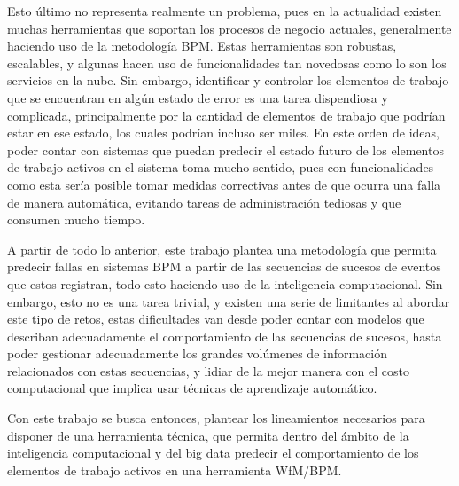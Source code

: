 Esto último no representa realmente un problema, pues en la actualidad existen muchas herramientas que soportan los procesos de negocio actuales, generalmente haciendo uso de la metodología BPM. Estas herramientas son robustas, escalables, y algunas hacen uso de funcionalidades tan novedosas como lo son los servicios en la nube. Sin embargo, identificar y controlar los elementos de trabajo que se encuentran en algún estado de error es una tarea dispendiosa y complicada, principalmente por la cantidad de elementos de trabajo que podrían estar en ese estado, los cuales podrían incluso ser miles. En este orden de ideas, poder contar con sistemas que puedan predecir el estado futuro de los elementos de trabajo activos en el sistema toma mucho sentido, pues con funcionalidades como esta sería posible tomar medidas correctivas antes de que ocurra una falla de manera automática, evitando tareas de administración tediosas y que consumen mucho tiempo. 

A partir de todo lo anterior, este trabajo plantea una metodología que permita predecir fallas en sistemas BPM a partir de las secuencias de sucesos de eventos que estos registran, todo esto haciendo uso de la inteligencia computacional. Sin embargo, esto no es una tarea trivial, y existen una serie de limitantes al abordar este tipo de retos, estas dificultades van desde poder contar con modelos que describan adecuadamente el comportamiento de las secuencias de sucesos, hasta poder gestionar adecuadamente los grandes volúmenes de información relacionados con estas secuencias, y lidiar de la mejor manera con el costo computacional que implica usar técnicas de aprendizaje automático. 

Con este trabajo se busca entonces, plantear los lineamientos necesarios para disponer de una herramienta técnica, que permita dentro del ámbito de la inteligencia computacional y del big data predecir el comportamiento de los elementos de trabajo activos en una herramienta WfM/BPM.
